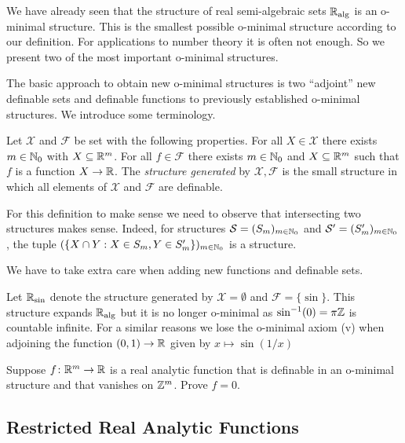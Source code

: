 We have already seen that the structure of real semi-algebraic sets
${\mathbb{R}}_{\mathrm{alg}}$ is an o-minimal structure. This is the smallest possible
o-minimal structure according to our definition. For applications to
number theory it is often not enough. So we present two of the most
important o-minimal structures.


The basic approach to obtain  new o-minimal structures is two
``adjoint'' new definable sets and definable functions to previously
established o-minimal structures.
We introduce some terminology.

\begin{definition}
  Let $\mathscr{X}$ and $\mathscr{F}$ be set with the following
  properties. For all $X\in \mathscr{X}$ there exists $m\in{\mathbb{N}}_0$ with
  $X\subseteq{\mathbb{R}}^m$. For all $f\in \mathscr{F}$ there exists $m\in{\mathbb{N}}_0$
  and $X\subseteq{\mathbb{R}}^m$ such that $f$ is a function $X\rightarrow{\mathbb{R}}$. The
  \emph{structure generated} by $\mathscr{X},\mathscr{F}$ is the small
  structure in which all elements of $\mathcal{X}$ and $\mathscr{F}$ are
  definable.
\end{definition}

For this definition to make sense we need to observe that intersecting
two structures makes sense. Indeed, for 
structures ${\mathcal S}=(S_m)_{m\in{\mathbb{N}}_0}$ and ${\mathcal S}'=(S'_m)_{m\in{\mathbb{N}}_0}$, the tuple
$(\{X\cap Y : X\in S_m, Y\in S'_m\})_{m\in{\mathbb{N}}_0}$ is a structure.

We have to take extra care when adding new functions and definable
sets. 

\begin{example}
  \label{ex:adjoinsin}
  Let ${\mathbb{R}}_{\sin}$ denote the structure generated by
  $\mathscr{X}=\emptyset$ and $\mathscr{F}=\{\sin \}$.
  This structure expands ${\mathbb{R}}_{\mathrm{alg}}$ but it is no longer o-minimal as
  $\sin^{-1}(0)=\pi{\mathbb{Z}}$ is countable infinite.
  For a similar reasons we lose the o-minimal axiom (v) when adjoining the function
  $(0,1)\rightarrow{\mathbb{R}}$ given by $x\mapsto \sin (1/x)$ 
\end{example}


\begin{exercise}
  \label{exer:periodic}
  Suppose $f\colon {\mathbb{R}}^m\rightarrow{\mathbb{R}}$ is a real analytic function
  that is definable in an o-minimal structure and
  that vanishes on ${\mathbb{Z}}^m$. Prove $f=0$.  
\end{exercise}

\subsection{Restricted Real Analytic Functions}

